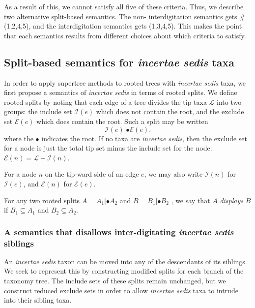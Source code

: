 \documentclass[english]{article}
\begin{document}
As a result of this, we cannot satisfy all five of these criteria.
Thus, we describe two alternative split-based semantics.
The non-
interdigitation semantics gets \# (1,2,4,5), and the interdigitation
semantics gets (1,3,4,5).
This makes the point that each semantics
results from different choices about which criteria to satisfy.

\subsection{Split-based semantics for \emph{incertae sedis} taxa}

In order to apply supertree methods to rooted trees with
\emph{incertae sedis} taxa, we first propose a semantics of
\emph{incertae sedis }in terms of rooted splits.
We define rooted
splits by noting that each edge of a tree divides the tip taxa
$\mathcal{L}$ into two groups: the include set $\mathcal{I}(e)$ which
does not contain the root, and the exclude set $\mathcal{E}(e)$ which
does contain the root.
Such a split may be written \[
\mathcal{I}(e)|\bullet\mathcal{E}(e).
\] where the $\bullet$ indicates
the root.
If no taxa are \emph{incertae sedis}, then the exclude set
for a node is just the total tip set minus the include set for the
node: $ \mathcal{E}(n) =\mathcal{L}-\mathcal{I}(n)$.


For a node $n$ on the tip-ward side of an edge $e$, we may also write
$\mathcal{I}(n)$ for $\mathcal{I}(e)$, and $\mathcal{E}(n)$ for
$\mathcal{E}(e)$.

For any two rooted splits $A=A_{1}|\bullet A_{2}$ and $B=B_{1}|\bullet
B_{2}$ , we say that $A$ \emph{displays }$B$ if $B_{1}\subseteq A_{1}$
and $B_{2}\subseteq A_{2}$.

\subsubsection{A semantics that disallows inter-digitating
\emph{incertae sedis} siblings}

An \emph{incertae sedis} taxon can be moved into any of the
descendants of its siblings.
We seek to represent this by constructing
modified splits for each branch of the taxonomy tree.
The include sets
of these splits remain unchanged, but we construct reduced exclude
sets in order to allow \emph{incertae sedis} taxa to intrude into
their sibling taxa.
\end{document}
